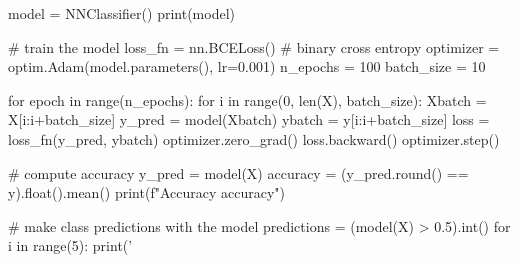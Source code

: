 \documentclass[%
oneside,                 %
final,                   %
10pt]{article}
\begin{document}
model = NNClassifier()
print(model)
 
# train the model
loss_fn   = nn.BCELoss()  # binary cross entropy
optimizer = optim.Adam(model.parameters(), lr=0.001)
n_epochs = 100
batch_size = 10
 
for epoch in range(n_epochs):
    for i in range(0, len(X), batch_size):
        Xbatch = X[i:i+batch_size]
        y_pred = model(Xbatch)
        ybatch = y[i:i+batch_size]
        loss = loss_fn(y_pred, ybatch)
        optimizer.zero_grad()
        loss.backward()
        optimizer.step()
 
# compute accuracy
y_pred = model(X)
accuracy = (y_pred.round() == y).float().mean()
print(f"Accuracy {accuracy}")

# make class predictions with the model
predictions = (model(X) > 0.5).int()
for i in range(5):
    print('%


\epycod




\end{document}
